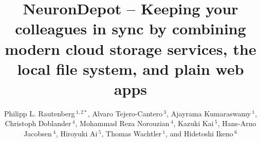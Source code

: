 \documentclass{frontiersSCNS} %
\def\firstAuthorLast{Rautenberg {et~al.}} %
\def\Authors{
Philipp L. Rautenberg\,$^{1,2*}$,
Alvaro Tejero-Cantero\,$^{3}$,
Ajayrama Kumaraswamy\,$^{1}$,
Christoph Doblander\,$^{4}$,
Mohammad Reza Norouzian\,$^{4}$,
Kazuki Kai\,$^{5}$,
Hans-Arno Jacobsen\,$^{4}$,
Hiroyuki Ai\,$^{5}$,
Thomas Wachtler\,$^{1}$,
and Hidetoshi Ikeno\,$^6$}
\begin{document}
\onecolumn
{}

\title[NeuronDepot – Keeping your colleagues in sync]{NeuronDepot – Keeping
your colleagues in sync by combining modern cloud storage services, the local
file system, and plain web apps}
\author[\firstAuthorLast ]{\Authors}
\address{}
\correspondance{}
\extraAuth{}%

\maketitle

\end{document}
